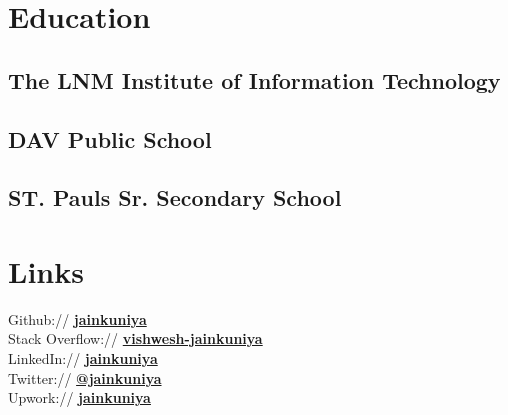 \documentclass[a4paper]{deedy-resume} %
\begin{document}
\begin{minipage}[t]{0.33\textwidth} %


\section{Education}

\subsection{The LNM Institute of Information Technology}


\sectionspace %

\subsection{DAV Public School}



\sectionspace %

\subsection{ST. Pauls Sr. Secondary School}


\sectionspace %


\section{Links}

Github:// \href{https://github.com/jainkuniya}{\bf jainkuniya} \\
Stack Overflow:// \href{https://stackoverflow.com/users/5612089/vishwesh-jainkuniya}{\bf vishwesh-jainkuniya} \\
LinkedIn:// \href{https://www.linkedin.com/in/jainkuniya}{\bf jainkuniya} \\
Twitter:// \href{https://twitter.com/jainkuniya}{\bf @jainkuniya} \\
Upwork:// \href{https://www.upwork.com/freelancers/~01841c33fc6a947c91}{\bf jainkuniya}


\end{minipage}
\end{document}
